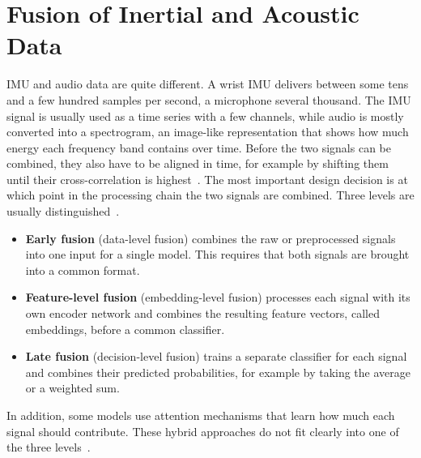 \section{Fusion of Inertial and Acoustic Data}
\label{sec:sota-fusion}

IMU and audio data are quite different. A wrist IMU delivers between some tens
and a few hundred samples per second, a microphone several thousand. The IMU
signal is usually used as a time series with a few channels, while audio is
mostly converted into a spectrogram, an image-like representation that shows
how much energy each frequency band contains over time. Before the two signals
can be combined, they also have to be aligned in time, for example by shifting
them until their cross-correlation is highest~\cite{koch2024recognition}. The
most important design decision is at which point in the processing chain the
two signals are combined. Three levels are usually
distinguished~\cite{alamin2019action}.
\begin{itemize}
  \item \textbf{Early fusion} (data-level fusion) combines the raw or
        preprocessed signals into one input for a single model. This requires
        that both signals are brought into a common format.
  \item \textbf{Feature-level fusion} (embedding-level fusion) processes each
        signal with its own encoder network and combines the resulting feature
        vectors, called embeddings, before a common classifier.
  \item \textbf{Late fusion} (decision-level fusion) trains a separate
        classifier for each signal and combines their predicted probabilities,
        for example by taking the average or a weighted sum.
\end{itemize}
In addition, some models use attention mechanisms that learn how much each
signal should contribute. These hybrid approaches do not fit clearly into one
of the three levels~\cite{gao2023mmtsa, nakabayashi2024multimodal}.

